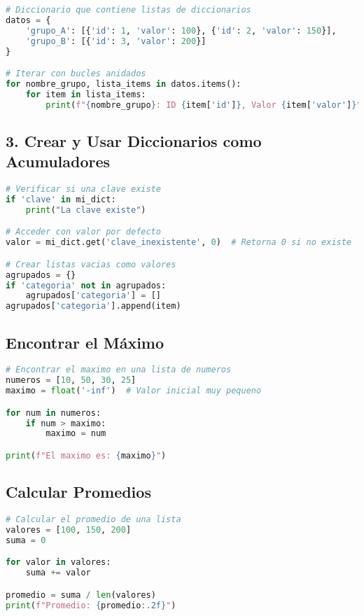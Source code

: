 \documentclass[11pt,a4paper]{article}
\begin{document}
\begin{lstlisting}[language=Python]
# Diccionario que contiene listas de diccionarios
datos = {
    'grupo_A': [{'id': 1, 'valor': 100}, {'id': 2, 'valor': 150}],
    'grupo_B': [{'id': 3, 'valor': 200}]
}

# Iterar con bucles anidados
for nombre_grupo, lista_items in datos.items():
    for item in lista_items:
        print(f"{nombre_grupo}: ID {item['id']}, Valor {item['valor']}")
\end{lstlisting}

\subsection{3. Crear y Usar Diccionarios como Acumuladores}

\begin{lstlisting}[language=Python]
# Verificar si una clave existe
if 'clave' in mi_dict:
    print("La clave existe")

# Acceder con valor por defecto
valor = mi_dict.get('clave_inexistente', 0)  # Retorna 0 si no existe

# Crear listas vacias como valores
agrupados = {}
if 'categoria' not in agrupados:
    agrupados['categoria'] = []
agrupados['categoria'].append(item)
\end{lstlisting}

\subsection{Encontrar el Máximo}

\begin{lstlisting}[language=Python]
# Encontrar el maximo en una lista de numeros
numeros = [10, 50, 30, 25]
maximo = float('-inf')  # Valor inicial muy pequeno

for num in numeros:
    if num > maximo:
        maximo = num

print(f"El maximo es: {maximo}")
\end{lstlisting}

\subsection{Calcular Promedios}

\begin{lstlisting}[language=Python]
# Calcular el promedio de una lista
valores = [100, 150, 200]
suma = 0

for valor in valores:
    suma += valor

promedio = suma / len(valores)
print(f"Promedio: {promedio:.2f}")
\end{lstlisting}
\end{document}
